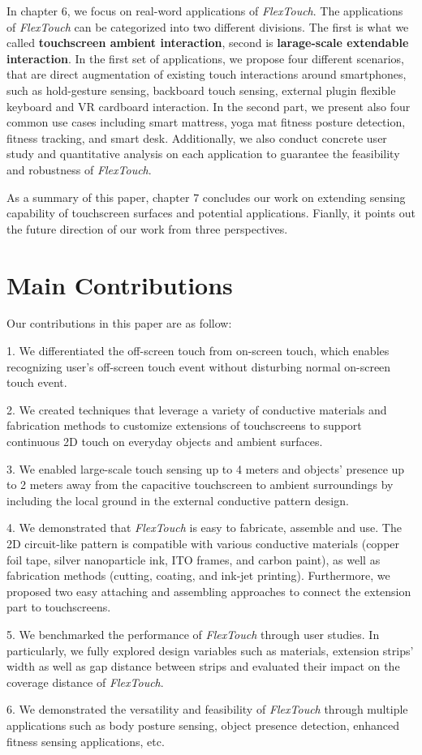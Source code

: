 In chapter 6, we focus on real-word applications of \textit{FlexTouch}. The applications of \textit{FlexTouch} can be categorized into two different divisions. The first is what we called \textbf{touchscreen ambient interaction}, second is \textbf{larage-scale extendable interaction}. In the first set of applications, we propose four different scenarios, that are direct augmentation of existing touch interactions around smartphones, such as hold-gesture sensing, backboard touch sensing, external plugin flexible keyboard and VR cardboard interaction. In the second part, we present also four common use cases including smart mattress, yoga mat fitness posture detection, fitness tracking, and smart desk. Additionally, we also conduct concrete user study and quantitative analysis on each application to guarantee the feasibility and robustness of \textit{FlexTouch}.  

As a summary of this paper, chapter 7 concludes our work on extending sensing capability of touchscreen surfaces and potential applications. Fianlly, it points out the future direction of our work from three perspectives.

\section{Main Contributions}
Our contributions in this paper are as follow:

1. We differentiated the off-screen touch from on-screen touch, which enables recognizing user's off-screen touch event without disturbing normal on-screen touch event. 

2. We created techniques that leverage a variety of conductive materials and fabrication methods to customize extensions of touchscreens to support continuous 2D touch on everyday objects and ambient surfaces.

3. We enabled large-scale touch sensing up to 4 meters and objects' presence up to 2 meters away from the capacitive touchscreen to ambient surroundings by including the local ground in the external conductive pattern design. 

4. We demonstrated that \textit{FlexTouch} is easy to fabricate, assemble and use. The 2D circuit-like pattern is compatible with various conductive materials (copper foil tape, silver nanoparticle ink, ITO frames, and carbon paint), as well as fabrication methods (cutting, coating, and ink-jet printing). Furthermore, we proposed two easy attaching and assembling approaches to connect the extension part to touchscreens. 

5. We benchmarked the performance of \textit{FlexTouch} through user studies. In particularly, we fully explored design variables such as materials, extension strips' width as well as gap distance between strips and evaluated their impact on the coverage distance of \textit{FlexTouch}. 

6. We demonstrated the versatility and feasibility of \textit{FlexTouch} through multiple applications such as body posture sensing, object presence detection, enhanced fitness sensing applications, etc.

